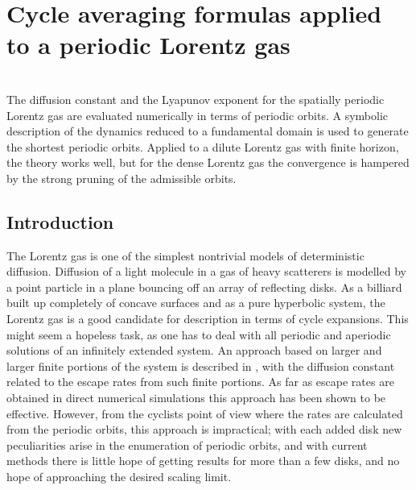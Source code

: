 

				\chapter{
Cycle averaging formulas applied to a periodic Lorentz gas
				}
\label{c-clipsSchreiber}

\ifboyscout
{}

\noindent
{}
\\

The diffusion constant and the Lyapunov exponent
for the spatially periodic Lorentz gas are evaluated
numerically in terms of periodic orbits.
A symbolic description of the dynamics reduced to a fundamental domain is
used to generate the shortest periodic orbits.
Applied to a dilute Lorentz gas with finite horizon, the
theory works well, but for the dense Lorentz gas the convergence
is hampered by the strong pruning of the admissible orbits.

\fi

\section{Introduction}


The Lorentz gas is one of the simplest nontrivial models
of deterministic diffusion.
Diffusion of a light molecule in a gas of heavy scatterers
is modelled
by a point particle in a plane bouncing off an array of reflecting disks.
As a billiard built up completely of
concave surfaces and as a pure hyperbolic system, the
Lorentz gas is a good candidate for description in terms of cycle
expansions.
This might seem a hopeless task, as one
has to deal with all periodic and aperiodic
solutions of an infinitely extended system. An
approach based on larger and larger finite portions of the system is described
in , with the diffusion constant related to
the escape rates from such finite portions.
As far as escape rates are obtained in direct numerical simulations
this approach has been shown to be effective.
However, from the cyclists point of view
where the rates are calculated from the periodic orbits,
this approach is impractical; with each added disk new peculiarities arise
in the enumeration of periodic orbits, and with current
methods there is little hope of getting results for more than a few disks,
and no hope of approaching the desired scaling limit.

